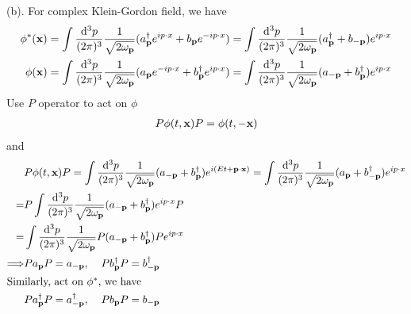 \documentclass{article}
\begin{document}
(b). For complex Klein-Gordon field, we have
\begin{align}
  \phi^*(\vb{x})&=\int\frac{\dd^3p}{(2\pi)^3}\frac{1}{\sqrt{2\omega_{\vb{p}}}}(a_{\vb{p}}^{\dagger}e^{ip\cdot x}+b_{\vb{p}}e^{-ip\cdot x})
  =\int\frac{\dd^3p}{(2\pi)^3}\frac{1}{\sqrt{2\omega_{\vb{p}}}}(a_{\vb{p}}^{\dagger}+b_{-\vb{p}})e^{ip\cdot x}\\
  \phi(\vb{x})&=\int\frac{\dd^3p}{(2\pi)^3}\frac{1}{\sqrt{2\omega_{\vb{p}}}}(a_{\vb{p}}e^{-ip\cdot x}+b_{\vb{p}}^{\dagger}e^{ip\cdot x})
  =\int\frac{\dd^3p}{(2\pi)^3}\frac{1}{\sqrt{2\omega_{\vb{p}}}}(a_{-\vb{p}}+b_{\vb{p}}^{\dagger})e^{ip\cdot x}\\
\end{align}
Use $P$ operator to act on $\phi$
\begin{align*}
  P\phi(t,\vb{x})P=\phi(t,-\vb{x})
\end{align*}
and
\begin{align*}
  &P\phi(t,\vb{x})P=\int\frac{\dd^3p}{(2\pi)^3}\frac{1}{\sqrt{2\omega_{\vb{p}}}}(a_{-\vb{p}}+b_{\vb{p}}^{\dagger})e^{i(Et+\vb{p}\cdot\vb{x})}=\int\frac{\dd^3p}{(2\pi)^3}\frac{1}{\sqrt{2\omega_{\vb{p}}}}(a_{\vb{p}}+b_{-\vb{p}}^{\dagger})e^{ip\cdot x}\\
  =&P\int\frac{\dd^3p}{(2\pi)^3}\frac{1}{\sqrt{2\omega_{\vb{p}}}}(a_{-\vb{p}}+b_{\vb{p}}^{\dagger})e^{ip\cdot x}P\\
  =&\int\frac{\dd^3p}{(2\pi)^3}\frac{1}{\sqrt{2\omega_{\vb{p}}}}P(a_{-\vb{p}}+b_{\vb{p}}^{\dagger})Pe^{ip\cdot x}\\
  \Longrightarrow&Pa_{\vb{p}}P=a_{-\vb{p}},\;\;\;\;Pb_{\vb{p}}^{\dagger}P=b_{-\vb{p}}^{\dagger}\\
  \intertext{Similarly, act on $\phi^*$, we have}&Pa_{\vb{p}}^{\dagger}P=a_{-\vb{p}}^{\dagger},\;\;\;\;Pb_{\vb{p}}P=b_{-\vb{p}}
\end{align*}
\end{document}
